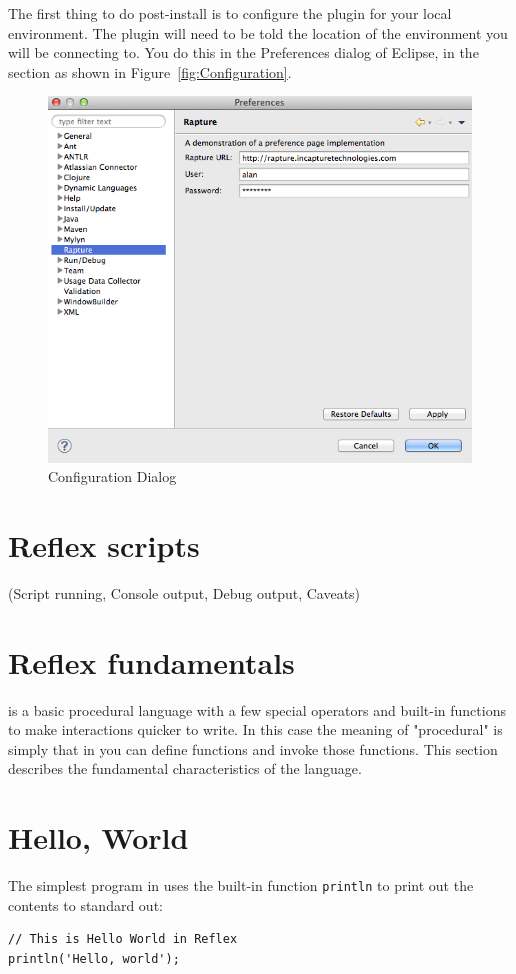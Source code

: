 The first thing to do post-install is to configure the \Rapture plugin for your local environment. The plugin will need to be told the location of the \Rapture environment you will be connecting to. You do this in the Preferences dialog of Eclipse, in the \Rapture section as shown in Figure~\vref{fig:Configuration}.

\begin{figure}[htb]
\centering
\includegraphics[scale=0.5]{images/Configuration.png}
\caption{Configuration Dialog}
\label{fig:Configuration}
\end{figure}

\section{Reflex scripts}
(Script running, Console output, Debug output, Caveats)

\section{Reflex fundamentals}
\Reflex is a basic procedural language with a few special operators  and built-in functions  to make \Rapture interactions quicker to write. In this case the meaning of "procedural" is simply that in \Reflex you can define functions and invoke those functions. This section describes the fundamental characteristics of the language.
\section{Hello, World}
The simplest program in \Reflex uses the built-in function \verb+println+  to print out the contents to standard out:
\begin{lstlisting}[caption={Hello world}]
// This is Hello World in Reflex
println('Hello, world');

\end{lstlisting}

